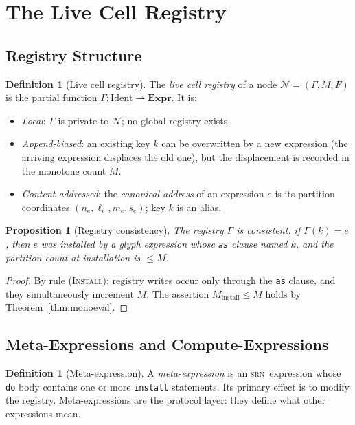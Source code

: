 \documentclass[twocolumn,11pt,a4paper]{article}
\newtheorem{proposition}[theorem]{Proposition}
\theoremstyle{definition}
\newtheorem{definition}[theorem]{Definition}
\theoremstyle{remark}
\newcommand{\srn}{\textsc{srn}}
\newcommand{\Node}{\mathcal{N}}
\newcommand{\Reg}{\Gamma}
\newcommand{\Expr}{\mathbf{Expr}}
\begin{document}
\section{The Live Cell Registry}
\label{sec:registry}

\subsection{Registry Structure}

\begin{definition}[Live cell registry]
\label{def:registry}
The \emph{live cell registry} of a node $\Node = (\Reg, M, F)$ is the
partial function $\Reg : \mathrm{Ident} \rightharpoonup \Expr$.  It is:
\begin{itemize}[noitemsep,topsep=2pt]
\item \emph{Local}: $\Reg$ is private to $\Node$; no global registry exists.
\item \emph{Append-biased}: an existing key $k$ can be overwritten by a
  new expression (the arriving expression displaces the old one), but
  the displacement is recorded in the monotone count $M$.
\item \emph{Content-addressed}: the \emph{canonical address} of an
  expression $e$ is its partition coordinates $(n_e, \ell_e, m_e, s_e)$;
  key $k$ is an alias.
\end{itemize}
\end{definition}

\begin{proposition}[Registry consistency]
\label{prop:regconsist}
The registry $\Reg$ is consistent: if $\Reg(k) = e$, then $e$ was
installed by a glyph expression whose \texttt{as} clause named $k$, and
the partition count at installation is $\leq M$.
\end{proposition}
\begin{proof}
By rule \textsc{(Install)}: registry writes occur only through the
\texttt{as} clause, and they simultaneously increment $M$.  The
assertion $M_{\mathrm{install}} \leq M$ holds by
Theorem~\ref{thm:monoeval}.
\end{proof}

\subsection{Meta-Expressions and Compute-Expressions}

\begin{definition}[Meta-expression]
A \emph{meta-expression} is an \srn\ expression whose \texttt{do} body
contains one or more \texttt{install} statements.  Its primary effect is
to modify the registry.  Meta-expressions are the protocol layer: they
define what other expressions mean.
\end{definition}
\end{document}
